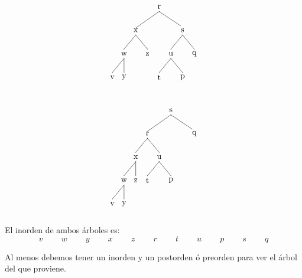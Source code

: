 \documentclass[10pt,a4paper,spanish]{report}
\begin{document}
\begin{minipage}{0.4\textwidth}
\begin{flushleft}
\[\begin{xy}
,(0,0)*+=<10mm>[]\txt<2cm>{r}
,(-10,-10)*+=<10mm>[]\txt<2cm>{x}
,(10,-10)*+=<10mm>[]\txt<2cm>{s}
,(-15,-20)*+=<10mm>[]\txt<2cm>{w}
,(-5,-20)*+=<10mm>[]\txt<2cm>{z}
,(5,-20)*+=<10mm>[]\txt<2cm>{u}
,(15,-20)*+=<10mm>[]\txt<2cm>{q}
,(0,-30)*+=<10mm>[]\txt<2cm>{t}
,(10,-30)*+=<10mm>[]\txt<2cm>{p}
,(-20,-30)*+=<10mm>[]\txt<2cm>{v}
,(-15,-30)*+=<10mm>[]\txt<2cm>{y}

\ar@{-} (0,-2);(-10,-9)
\ar@{-} (0,-2);(9,-8)
\ar@{-} (-10,-12);(-15,-18)
\ar@{-} (-10,-12);(-5,-18)
\ar@{-} (10,-12);(5,-18)
\ar@{-} (10,-12);(15,-18)
\ar@{-} (5,-22);(0,-28)
\ar@{-} (5,-22);(10,-28)
\ar@{-} (-15,-22);(-20,-28)
\ar@{-} (-15,-22);(-15,-28)
\end{xy}\]
\end{flushleft}
\end{minipage}
\begin{minipage}{0.6\textwidth}
\begin{flushright}
\[\begin{xy}
,(0,0)*+=<10mm>[]\txt<2cm>{s}
,(-10,-10)*+=<10mm>[]\txt<2cm>{r}
,(10,-10)*+=<10mm>[]\txt<2cm>{q}
,(-15,-20)*+=<10mm>[]\txt<2cm>{x}
,(-5,-20)*+=<10mm>[]\txt<2cm>{u}
,(-20,-30)*+=<10mm>[]\txt<2cm>{w}
,(-15,-30)*+=<10mm>[]\txt<2cm>{z}
,(-25,-40)*+=<10mm>[]\txt<2cm>{v}
,(-20,-40)*+=<10mm>[]\txt<2cm>{y}
,(-10,-30)*+=<10mm>[]\txt<2cm>{t}
,(0,-30)*+=<10mm>[]\txt<2cm>{p}

\ar@{-} (0,-2);(-10,-9)
\ar@{-} (0,-2);(9,-8)
\ar@{-} (-10,-12);(-15,-18)
\ar@{-} (-10,-12);(-5,-18)
\ar@{-} (-15,-22);(-20,-28)
\ar@{-} (-15,-22);(-15,-28)
\ar@{-} (-20,-32);(-25,-38)
\ar@{-} (-20,-32);(-20,-38)
\ar@{-} (-5,-22);(-10,-28)
\ar@{-} (-5,-22);(0,-28)
\end{xy}\]
\end{flushright}
\end{minipage}

\noindent
El inorden de ambos árboles es:
\begin{displaymath}
v \qquad\ w \qquad\ y \qquad\ x \qquad\ z \qquad\ r \qquad\ t \qquad\ u \qquad\ p \qquad\ s \qquad\ q
\end{displaymath}

\noindent
Al menos debemos tener un inorden y un postorden ó preorden para ver el árbol del que proviene.
\end{document}

